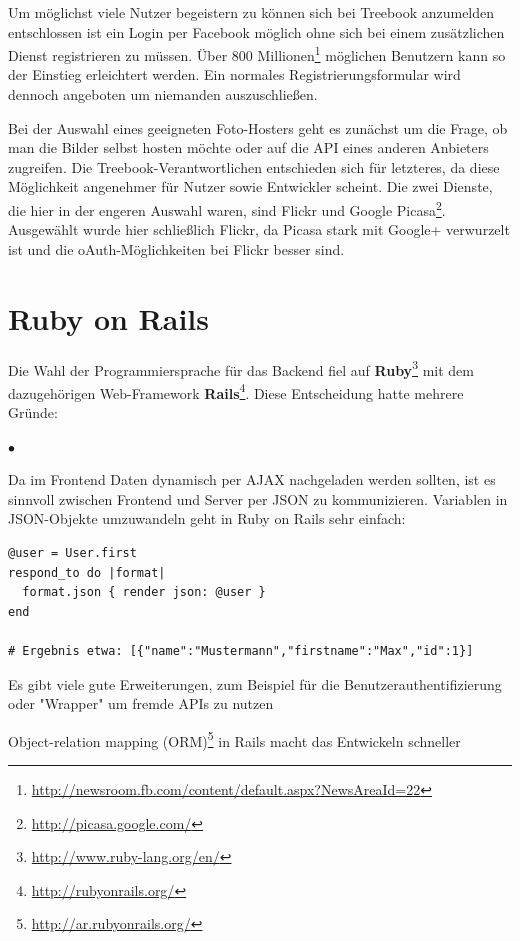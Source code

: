 \documentclass[10pt,a4paper]{book}
\begin{document}
Um möglichst viele Nutzer begeistern zu können sich bei Treebook anzumelden entschlossen ist ein Login per Facebook möglich ohne sich bei einem zusätzlichen Dienst registrieren zu müssen. Über 800 Millionen\footnote{\href{http://newsroom.fb.com/content/default.aspx?NewsAreaId=22}{http://newsroom.fb.com/content/default.aspx?NewsAreaId=22}} möglichen Benutzern kann so der Einstieg erleichtert werden. Ein normales Registrierungsformular wird dennoch angeboten um niemanden auszuschließen.

Bei der Auswahl eines geeigneten Foto-Hosters geht es zunächst um die Frage, ob man die Bilder selbst hosten möchte oder auf die API eines anderen Anbieters zugreifen. Die Treebook-Verantwortlichen entschieden sich für letzteres, da diese Möglichkeit angenehmer für Nutzer sowie Entwickler scheint. Die zwei Dienste, die hier in der engeren Auswahl waren, sind Flickr und Google Picasa\footnote{\href{http://picasa.google.com/}{http://picasa.google.com/}}. Ausgewählt wurde hier schließlich Flickr, da Picasa stark mit Google+ verwurzelt ist und die oAuth-Möglichkeiten bei Flickr besser sind.  
\section{Ruby on Rails}
Die Wahl der Programmiersprache für das Backend fiel auf \textbf{Ruby}\footnote{\href{http://www.ruby-lang.org/en/}{http://www.ruby-lang.org/en/}} mit dem dazugehörigen Web-Framework \textbf{Rails}\footnote{\href{http://rubyonrails.org/}{http://rubyonrails.org/}}. Diese Entscheidung hatte mehrere Gründe:
\lstset{language=bash}
\begin{list}{$\bullet$}{}
\item Da im Frontend Daten dynamisch per AJAX nachgeladen werden sollten, ist es sinnvoll zwischen Frontend und Server per JSON zu kommunizieren. Variablen in JSON-Objekte umzuwandeln geht in Ruby on Rails sehr einfach:
\begin{lstlisting}
@user = User.first
respond_to do |format|
  format.json { render json: @user }
end

# Ergebnis etwa: [{"name":"Mustermann","firstname":"Max","id":1}]
\end{lstlisting}
\item Es gibt viele gute Erweiterungen, zum Beispiel für die Benutzerauthentifizierung oder "Wrapper" um fremde APIs zu nutzen
\item Object-relation mapping (ORM)\footnote{\href{http://ar.rubyonrails.org/}{http://ar.rubyonrails.org/}} in Rails macht das Entwickeln schneller
\end{list}
\end{document}
